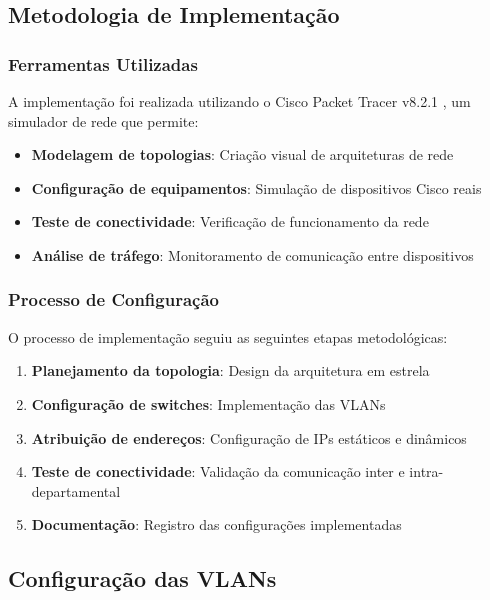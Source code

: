 \subsection{Metodologia de Implementação}

\subsubsection{Ferramentas Utilizadas}

A implementação foi realizada utilizando o Cisco Packet Tracer v8.2.1 \cite{cisco2023packettracer}, um simulador de rede que permite:

\begin{itemize}
    \item \textbf{Modelagem de topologias}: Criação visual de arquiteturas de rede
    \item \textbf{Configuração de equipamentos}: Simulação de dispositivos Cisco reais
    \item \textbf{Teste de conectividade}: Verificação de funcionamento da rede
    \item \textbf{Análise de tráfego}: Monitoramento de comunicação entre dispositivos
\end{itemize}

\subsubsection{Processo de Configuração}

O processo de implementação seguiu as seguintes etapas metodológicas:

\begin{enumerate}
    \item \textbf{Planejamento da topologia}: Design da arquitetura em estrela
    \item \textbf{Configuração de switches}: Implementação das VLANs
    \item \textbf{Atribuição de endereços}: Configuração de IPs estáticos e dinâmicos
    \item \textbf{Teste de conectividade}: Validação da comunicação inter e intra-departamental
    \item \textbf{Documentação}: Registro das configurações implementadas
\end{enumerate}

\subsection{Configuração das VLANs}

